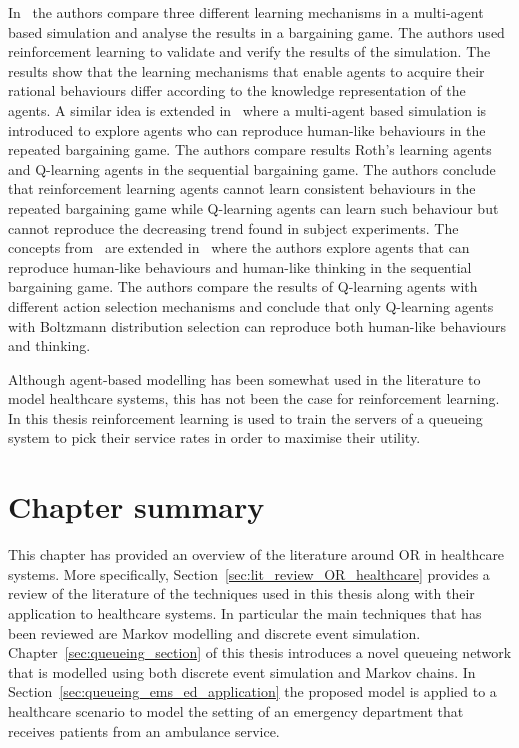 In~\cite{Takadama200326} the authors compare three different learning mechanisms
in a multi-agent based simulation and analyse the results in a bargaining game.
The authors used reinforcement learning to validate and verify the results of
the simulation.
The results show that the learning mechanisms that enable agents to acquire
their rational behaviours differ according to the knowledge representation of
the agents.
A similar idea is extended in~\cite{Takadama2007156} where a multi-agent based
simulation is introduced to explore agents who can reproduce human-like
behaviours in the repeated bargaining game.
The authors compare results Roth's learning agents and Q-learning agents in the
sequential bargaining game.
The authors conclude that reinforcement learning agents cannot learn consistent
behaviours in the repeated bargaining game while Q-learning agents can learn
such behaviour but cannot reproduce the decreasing trend found in subject
experiments.
The concepts from~\cite{Takadama200326,Takadama2007156} are extended
in~\cite{Takadama2008} where the authors explore agents that can reproduce
human-like behaviours and human-like thinking in the sequential bargaining
game.
The authors compare the results of Q-learning agents with different action
selection mechanisms and conclude that only Q-learning agents with Boltzmann
distribution selection can reproduce both human-like behaviours and thinking.

Although agent-based modelling has been somewhat used in the literature to
model healthcare systems, this has not been the case for reinforcement
learning.
In this thesis reinforcement learning is used to train the servers of a
queueing system to pick their service rates in order to maximise their
utility.

\section{Chapter summary}

This chapter has provided an overview of the literature around OR in healthcare
systems.
More specifically, Section~\ref{sec:lit_review_OR_healthcare} provides a review
of the literature of the techniques used in this thesis along with their
application to healthcare systems.
In particular the main techniques that has been reviewed are Markov modelling
and discrete event simulation.
Chapter~\ref{sec:queueing_section} of this thesis introduces a novel queueing
network that is modelled using both discrete event simulation and Markov
chains.
In Section~\ref{sec:queueing_ems_ed_application} the proposed model is applied
to a healthcare scenario to model the setting of an emergency department that
receives patients from an ambulance service.

